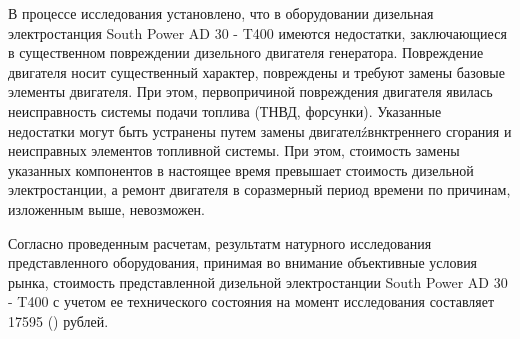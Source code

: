 В процессе исследования установлено, что в оборудовании  дизельная электростанция South Power AD 30 - T400 имеются недостатки, заключающиеся в существенном повреждении дизельного двигателя генератора. Повреждение двигателя носит существенный характер, повреждены и требуют замены базовые элементы двигателя. При этом, первопричиной повреждения двигателя явилась неисправность системы подачи топлива (ТНВД, форсунки).  Указанные недостатки могут быть устранены путем замены двигателźвнктреннего сгорания и неисправных элементов топливной системы. При этом, стоимость замены указанных компонентов в настоящее время превышает стоимость дизельной электростанции, а  ремонт двигателя в соразмерный период времени по причинам, изложенным выше, невозможен. 


Согласно проведенным расчетам, результатм натурного исследования представленного оборудования, принимая во внимание объективные условия рынка, стоимость представленной дизельной электростанции South Power AD 30 - T400 с учетом ее технического состояния на момент исследования составляет 17595 () рублей.

%
%







